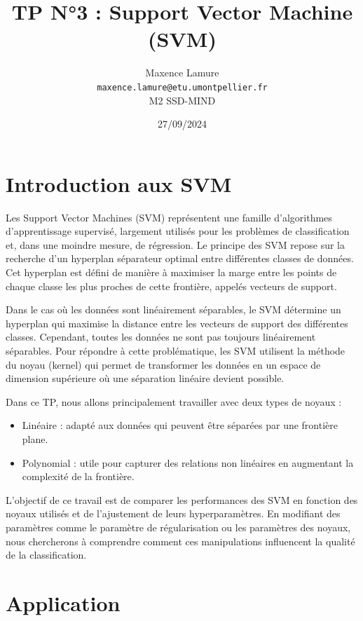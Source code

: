 \documentclass{scrartcl}
\title{TP N°3 : Support Vector Machine (SVM)}
\author{
  Maxence Lamure\\
  \texttt{maxence.lamure@etu.umontpellier.fr}\\
  M2 SSD-MIND
}
\date{27/09/2024}
\begin{document}
\maketitle

\section{Introduction aux SVM}
\hspace{7pt} Les Support Vector Machines (SVM) représentent une famille d'algorithmes d'apprentissage supervisé, largement utilisés pour les problèmes de classification et, dans une moindre mesure, de régression. Le principe des SVM repose sur la recherche d'un hyperplan séparateur optimal entre différentes classes de données. Cet hyperplan est défini de manière à maximiser la marge entre les points de chaque classe les plus proches de cette frontière, appelés vecteurs de support.\newline

Dans le cas où les données sont linéairement séparables, le SVM détermine un hyperplan qui maximise la distance entre les vecteurs de support des différentes classes. Cependant, toutes les données ne sont pas toujours linéairement séparables. Pour répondre à cette problématique, les SVM utilisent la méthode du noyau (kernel) qui permet de transformer les données en un espace de dimension supérieure où une séparation linéaire devient possible.\newline

Dans ce TP, nous allons principalement travailler avec deux types de noyaux :
\begin{itemize}
    \item Linéaire : adapté aux données qui peuvent être séparées par une frontière plane.
    \item Polynomial : utile pour capturer des relations non linéaires en augmentant la complexité de la frontière.
\end{itemize}

L'objectif de ce travail est de comparer les performances des SVM en fonction des noyaux utilisés et de l'ajustement de leurs hyperparamètres. En modifiant des paramètres comme le paramètre de régularisation ou les paramètres des noyaux, nous chercherons à comprendre comment ces manipulations influencent la qualité de la classification.

\section{Application}
\end{document}
